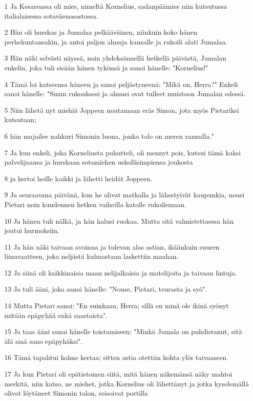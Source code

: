 \par 1 Ja Kesareassa oli mies, nimeltä Kornelius, sadanpäämies niin kutsutussa italialaisessa sotaväenosastossa.
\par 2 Hän oli hurskas ja Jumalaa pelkääväinen, niinkuin koko hänen perhekuntansakin, ja antoi paljon almuja kansalle ja rukoili alati Jumalaa.
\par 3 Hän näki selvästi näyssä, noin yhdeksännellä hetkellä päivästä, Jumalan enkelin, joka tuli sisään hänen tykönsä ja sanoi hänelle: "Kornelius!"
\par 4 Tämä loi katseensa häneen ja sanoi peljästyneenä: "Mikä on, Herra?" Enkeli sanoi hänelle: "Sinun rukouksesi ja almusi ovat tulleet muistoon Jumalan edessä.
\par 5 Niin lähetä nyt miehiä Joppeen noutamaan eräs Simon, jota myös Pietariksi kutsutaan;
\par 6 hän majailee nahkuri Simonin luona, jonka talo on meren rannalla."
\par 7 Ja kun enkeli, joka Korneliusta puhutteli, oli mennyt pois, kutsui tämä kaksi palvelijaansa ja hurskaan sotamiehen uskollisimpiensa joukosta
\par 8 ja kertoi heille kaikki ja lähetti heidät Joppeen.
\par 9 Ja seuraavana päivänä, kun he olivat matkalla ja lähestyivät kaupunkia, nousi Pietari noin kuudennen hetken vaiheilla katolle rukoilemaan.
\par 10 Ja hänen tuli nälkä, ja hän halusi ruokaa. Mutta sitä valmistettaessa hän joutui hurmoksiin.
\par 11 Ja hän näki taivaan avoinna ja tulevan alas astian, ikäänkuin suuren liinavaatteen, joka neljästä kulmastaan laskettiin maahan.
\par 12 Ja siinä oli kaikkinaisia maan nelijalkaisia ja matelijoita ja taivaan lintuja.
\par 13 Ja tuli ääni, joka sanoi hänelle: "Nouse, Pietari, teurasta ja syö".
\par 14 Mutta Pietari sanoi: "En suinkaan, Herra; sillä en minä ole ikinä syönyt mitään epäpyhää enkä saastaista".
\par 15 Ja taas ääni sanoi hänelle toistamiseen: "Minkä Jumala on puhdistanut, sitä älä sinä sano epäpyhäksi".
\par 16 Tämä tapahtui kolme kertaa; sitten astia otettiin kohta ylös taivaaseen.
\par 17 Ja kun Pietari oli epätietoinen siitä, mitä hänen näkemänsä näky mahtoi merkitä, niin katso, ne miehet, jotka Kornelius oli lähettänyt ja jotka kyselemällä olivat löytäneet Simonin talon, seisoivat portilla
